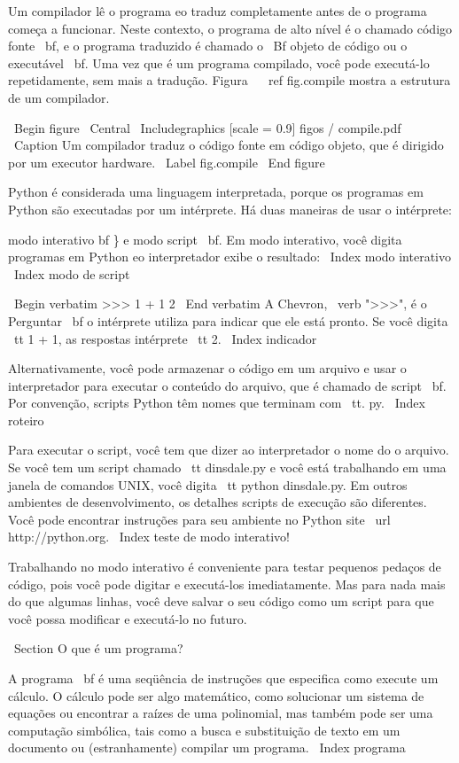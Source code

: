 \documentclass[10pt]{book}
\begin{document}
Um compilador lê o programa eo traduz completamente antes de o
programa começa a funcionar. Neste contexto, o programa de alto nível é
o chamado código fonte {\ bf}, e o programa traduzido é chamado o
{\ Bf objeto de código} ou {o executável \ bf}. Uma vez que é um programa
compilado, você pode executá-lo repetidamente, sem mais a tradução.
Figura ~ \ ref {fig.compile} mostra a estrutura de um compilador.

\ Begin {figure}
\ Central
{\ Includegraphics [scale = 0.9] {figos / compile.pdf}}
\ Caption {Um compilador traduz o código fonte em código objeto, que é
dirigido por um executor hardware.}
\ Label {} fig.compile
\ End {figure}

Python é considerada uma linguagem interpretada, porque os programas em Python
são executadas por um intérprete. Há duas maneiras de usar o
intérprete: {modo interativo bf \} e {modo script \ bf}. Em
modo interativo, você digita programas em Python eo interpretador exibe
o resultado:
\ Index {modo interativo}
\ Index {modo de script}

\ Begin {verbatim}
>>> 1 + 1
2
\ End {verbatim}
%
A Chevron, \ verb ">>>", é o
{Perguntar \ bf} o intérprete utiliza para indicar que ele está pronto. Se
você digita {\ tt 1 + 1}, as respostas intérprete {\ tt 2}.
\ Index {indicador}

Alternativamente, você pode armazenar o código em um arquivo e usar o interpretador para
executar o conteúdo do arquivo, que é chamado de {script \ bf}. Por
convenção, scripts Python têm nomes que terminam com {\ tt. py}.
\ Index {} roteiro

Para executar o script, você tem que dizer ao interpretador o nome do
o arquivo. Se você tem um script chamado {\ tt dinsdale.py} e você está
trabalhando em uma janela de comandos UNIX, você digita {\ tt python
dinsdale.py}. Em outros ambientes de desenvolvimento, os detalhes
scripts de execução são diferentes. Você pode encontrar instruções para
seu ambiente no Python site \ url {http://python.org}.
\ Index {teste de modo interativo!}

Trabalhando no modo interativo é conveniente para testar pequenos pedaços de
código, pois você pode digitar e executá-los imediatamente. Mas para
nada mais do que algumas linhas, você deve salvar o seu código
como um script para que você possa modificar e executá-lo no futuro.


\ Section {O que é um programa?}

A {programa \ bf} é uma seqüência de instruções que especifica como
execute um cálculo. O cálculo pode ser algo
matemático, como solucionar um sistema de equações ou encontrar a
raízes de uma polinomial, mas também pode ser uma computação simbólica, tais
como a busca e substituição de texto em um documento ou (estranhamente)
compilar um programa.
\ Index {programa}

}
\end{document}
